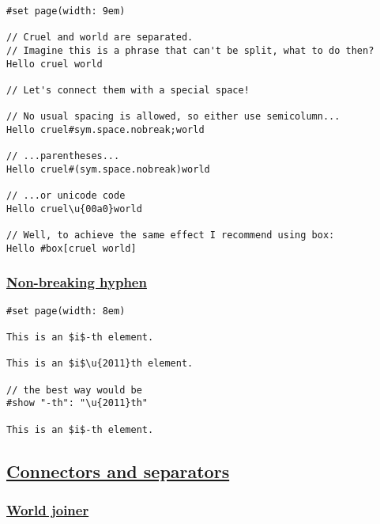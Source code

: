 \begin{verbatim}
#set page(width: 9em)

// Cruel and world are separated.
// Imagine this is a phrase that can't be split, what to do then?
Hello cruel world

// Let's connect them with a special space!

// No usual spacing is allowed, so either use semicolumn...
Hello cruel#sym.space.nobreak;world

// ...parentheses...
Hello cruel#(sym.space.nobreak)world

// ...or unicode code
Hello cruel\u{00a0}world

// Well, to achieve the same effect I recommend using box:
Hello #box[cruel world]
\end{verbatim}

\pandocbounded{}

\subsubsection{\texorpdfstring{\hyperref[non-breaking-hyphen]{Non-breaking
hyphen}}{Non-breaking hyphen}}\label{non-breaking-hyphen}

\begin{verbatim}
#set page(width: 8em)

This is an $i$-th element.

This is an $i$\u{2011}th element.

// the best way would be
#show "-th": "\u{2011}th"

This is an $i$-th element.
\end{verbatim}

\pandocbounded{}

\subsection{\texorpdfstring{\hyperref[connectors-and-separators]{Connectors
and
separators}}{Connectors and separators}}\label{connectors-and-separators}

\subsubsection{\texorpdfstring{\hyperref[world-joiner]{World
joiner}}{World joiner}}\label{world-joiner}

